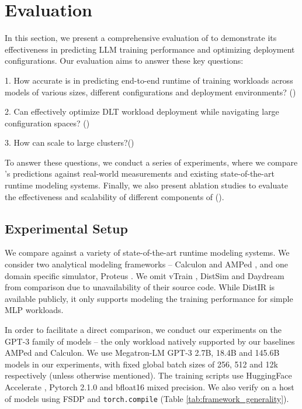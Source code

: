 
\section{Evaluation}
\label{sec-eval}

In this section, we present a comprehensive evaluation of \sysname to demonstrate its effectiveness in predicting LLM training performance and optimizing deployment configurations. Our evaluation aims to answer these key questions:

1. How accurate is \sysname in predicting end-to-end runtime of training workloads across models of various sizes, different configurations and deployment environments?  ()

2. Can \sysname effectively optimize DLT workload deployment while navigating large configuration spaces? ()

3. How can \sysname scale to large clusters?()

To answer these questions, we conduct a series of experiments, where we compare \sysname's predictions against real-world measurements and existing state-of-the-art runtime modeling systems. Finally, we also present ablation studies to evaluate the effectiveness and scalability of different components of \sysname ().




\subsection{Experimental Setup}


 We compare \sysname against a variety of state-of-the-art runtime modeling systems. We consider two analytical modeling frameworks -- Calculon \cite{isaev2023calculon} and AMPed \cite{moolchandani2023amped}, and one domain specific simulator, Proteus \cite{duan2023proteus}. We omit vTrain \cite{bang2023vtrain}, DistSim \cite{lu2023distsim} and Daydream \cite{zhu2020daydream} from comparison due to unavailability of their source code. While DistIR \cite{santhanam2021distir} is available publicly, it only supports modeling the training performance for simple MLP workloads.



  In order to facilitate a direct comparison, we conduct our experiments on the GPT-3 \cite{brown2020language} family of models -- the only workload natively supported by our baselines AMPed and Calculon. We use Megatron-LM \cite{megatron} GPT-3 \cite{brown2020language} 2.7B, 18.4B and 145.6B models in our experiments, with fixed global batch sizes of 256, 512 and 12k respectively (unless otherwise mentioned). The training scripts use HuggingFace Accelerate \cite{hfaccelerate}, Pytorch 2.1.0 \cite{ansel2024pytorch} and bfloat16 mixed precision. We also verify \sysname on a host of models using FSDP and \texttt{torch.compile} (Table \ref{tab:framework_generality}).

